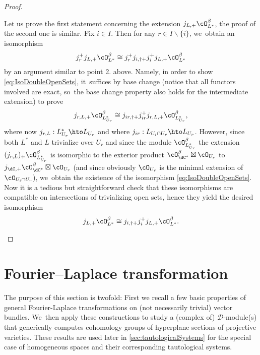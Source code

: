 \begin{proof}
\begin{enumerate}
Let us prove the first statement concerning the extension $j_{L,+}\cO_{L^*}^\beta$, the proof of the second one is similar. Fix $i\in I$. Then for any $r\in I\backslash\{i\}$, we~obtain an isomorphism
\begin{equation}\label{eq:IsoDoubleOpenSets}
j_r^+ j_{L,+} \cO^\beta_{L^{*}} \cong j_r^+ j_{i,\dag+} j_i^+ j_{L,+} \cO^\beta_{L^{*}}
\end{equation}
by an argument similar to point 2. above. Namely, in order to show \eqref{eq:IsoDoubleOpenSets}, it~suffices by base change (notice that all functors involved are exact, so~the base change property also holds for the intermediate extension) to prove
\[
j_{r,L,+} \cO_{L^*_{U_r}}^\beta \cong
j_{ir,\dag+}
j_{ir}^+
j_{r,L,+} \cO^\beta_{L_{U_r}^{*}},
\]
where now $j_{r,L}:L^*_{U_r}\hto L_{U_r}$ and where
$j_{ir}:L_{U_i\cap U_r}\hto L_{U_r}$. However, since both $L^*$ and $L$ trivialize over $U_r$ and since the module $\cO_{L_{U_r}^*}^\beta$ \resp the extension $(j_{r,L})_+\cO_{L_{U_r}^*}^\beta$ is isomorphic to the exterior product $\cO_{\dC^*}^\beta\boxtimes \cO_{U_r}$ \resp to $j_{\dC,+}\cO_{\dC^*}^\beta\boxtimes \cO_{U_r}$ (and since obviously
$\cO_{U_r}$ is the minimal extension of $\cO_{U_i\cap U_r}$), we~obtain the existence of the isomorphism \eqref{eq:IsoDoubleOpenSets}. Now it is a tedious but straightforward check that these isomorphisms are compatible on intersections of trivializing open sets, hence they yield the desired isomorphism
\[
j_{L,+} \cO^\beta_{L^{*}} \cong j_{i,\dag+} j_i^+ j_{L,+} \cO^\beta_{L^{*}}.\qedhere
\]
\end{enumerate}
\end{proof}

\section{Fourier--Laplace transformation} \label{sec:FLOnVecBundles}

The purpose of this section is twofold: First we recall a few basic properties of general Fourier-Laplace transformations on (not necessarily trivial) vector bundles. We~then apply these constructions to study a (complex of) $\mathscr{D}$\nobreakdash-mod\-ule(s) that generically computes cohomology groups of hyperplane sections of projective varieties. These results are used later in \cref{sec:tautologicalSystems} for the special case of
homogeneous spaces and their corresponding tautological systems.

 \label{ssec:FLBasics}

